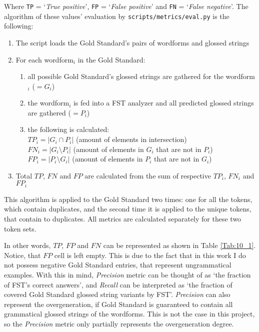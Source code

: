 Where \texttt{TP} = `\textit{True positive}', \texttt{FP} = `\textit{False positive}' and \texttt{FN} = `\textit{False negative}'. The algorithm of these values' evaluation by \texttt{scripts/metrics/eval.py} is the following: 
\begin{samepage}
\begin{enumerate}
    \item The script loads the Gold Standard's pairs of wordforms and glossed strings
    \item For each wordform$_i$ in the Gold Standard:
    \begin{enumerate}
        \item all possible Gold Standard's glossed strings are gathered for the wordform$_i$ ($=G_i$)
        \item the wordform$_i$ is fed into a FST analyzer and all predicted glossed strings are gathered ($=P_i$)
        \item the following is calculated: \\
        $TP_i = |G_i \cap P_i|$ (amount of elements in intersection)\\
        $FN_i = |G_i \setminus P_i|$ (amount of elements in $G_i$ that are not in $P_i$)\\
        $FP_i = |P_i \setminus G_i|$ (amount of elements in $P_i$ that are not in $G_i$)
    \end{enumerate}
    \item Total $TP$, $FN$ and $FP$ are calculated from the sum of respective $TP_i$, $FN_i$ and $FP_i$
\end{enumerate}
\end{samepage}

This algorithm is applied to the Gold Standard two times: one for all the tokens, which contain duplicates, and the second time it is applied to the unique tokens, that contain to duplicates. All metrics are calculated separately for these two token sets.

In other words, $TP$, $FP$ and $FN$ can be represented as shown in Table \ref{Tab:10_1}. Notice, that $FP$ cell is left empty. This is due to the fact that in this work I do not possess negative Gold Standard entries, that represent ungrammatical examples. With this in mind, \textit{Precision} metric can be thought of as `the fraction of FST's correct answers', and \textit{Recall} can be interpreted as `the fraction of covered Gold Standard glossed string variants by FST'. \textit{Precision} can also represent the overgeneration, if Gold Standard is guaranteed to contain all grammatical glossed strings of the wordforms. This is not the case in this project, so the \textit{Precision} metric only partially represents the overgeneration degree.

